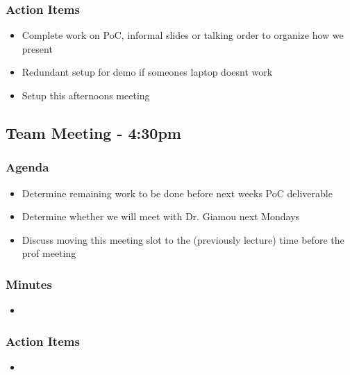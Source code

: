 		\subsubsection*{Action Items}
			\begin{itemize}
				\item Complete work on PoC, informal slides or talking order to organize how we present
				\item Redundant setup for demo if someones laptop doesnt work
				\item Setup this afternoons meeting
			\end{itemize}

	\subsection*{Team Meeting - 4:30pm}
		\subsubsection*{Agenda}
			\begin{itemize}
				\item Determine remaining work to be done before next weeks PoC deliverable
				\item Determine whether we will meet with Dr. Giamou next Mondays
				\item Discuss moving this meeting slot to the (previously lecture) time before the prof meeting
			\end{itemize}

		\subsubsection*{Minutes}
			\begin{itemize}
				\item 
			\end{itemize}

		\subsubsection*{Action Items}
			\begin{itemize}
				\item
			\end{itemize}


